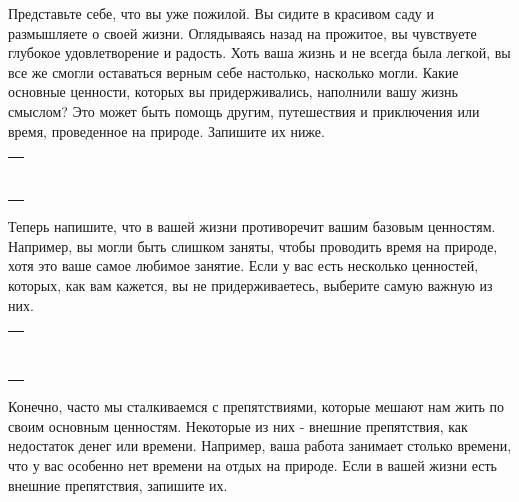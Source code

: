  \label{Ex:Discovering_Our_Core_Values}
\begin{itemize}
	\itemWritingHand Представьте себе, что вы уже пожилой. Вы сидите в красивом саду и размышляете о своей жизни. Оглядываясь назад на прожитое, вы чувствуете глубокое удовлетворение и радость. Хоть ваша жизнь и не всегда была легкой, вы все же смогли оставаться верным себе настолько, насколько могли. Какие основные ценности, которых вы придерживались, наполнили вашу жизнь смыслом? Это может быть помощь другим, путешествия и приключения или время, проведенное на природе. Запишите их ниже.
\end{itemize}
\setlength{\extrarowheight}{2mm}
\begin{tabularx}{\textwidth}{X}
	\\
	\arrayrulecolor{gray}\hline\\
	\hline\\
	\hline\\
	\hline\\
	\hline\\
	\hline\\	
	\hline\\
	\hline\\
\end{tabularx}
\setlength{\extrarowheight}{0mm}
\begin{itemize}
	\itemWritingHand Теперь напишите, что в вашей жизни противоречит вашим базовым ценностям. Например, вы могли быть слишком заняты, чтобы проводить время на природе, хотя это ваше самое любимое занятие.  Если у вас есть несколько ценностей, которых, как вам кажется, вы не придерживаетесь, выберите самую важную из них.
\end{itemize}
\setlength{\extrarowheight}{2mm}
\begin{tabularx}{\textwidth}{X}
	\\
	\arrayrulecolor{gray}\hline\\
	\hline\\
	\hline\\
	\hline\\
	\hline\\
	\hline\\	
	\hline\\
	\hline\\
	\hline\\
\end{tabularx}
\setlength{\extrarowheight}{0mm}
\begin{itemize}
	\itemWritingHand Конечно, часто мы сталкиваемся с препятствиями, которые мешают нам жить по своим основным ценностям. Некоторые из них - внешние препятствия, как недостаток денег или времени. Например, ваша работа занимает столько времени, что у вас особенно нет времени на отдых на природе. Если в вашей жизни есть внешние препятствия, запишите их.
\end{itemize}
